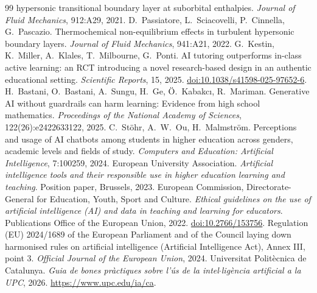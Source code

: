\documentclass[11pt]{article}
\begin{document}
\begin{thebibliography}{99}
hypersonic transitional boundary layer at suborbital enthalpies. \emph{Journal of Fluid
Mechanics}, 912:A29, 2021.
 D.\ Passiatore, L.\ Sciacovelli, P.\ Cinnella, G.\ Pascazio.
Thermochemical non-equilibrium effects in turbulent hypersonic boundary layers.
\emph{Journal of Fluid Mechanics}, 941:A21, 2022.
 G.\ Kestin, K.\ Miller, A.\ Klales, T.\ Milbourne, G.\ Ponti. AI tutoring
outperforms in-class active learning: an RCT introducing a novel research-based design in an
authentic educational setting. \emph{Scientific Reports}, 15, 2025.
\href{https://doi.org/10.1038/s41598-025-97652-6}{doi:10.1038/s41598-025-97652-6}.
 H.\ Bastani, O.\ Bastani, A.\ Sungu, H.\ Ge, \"O.\ Kabakc\i{}, R.\
Mariman. Generative AI without guardrails can harm learning: Evidence from high school
mathematics. \emph{Proceedings of the National Academy of Sciences}, 122(26):e2422633122,
2025.
 C.\ St\"ohr, A.\ W.\ Ou, H.\ Malmstr\"om. Perceptions and usage of AI
chatbots among students in higher education across genders, academic levels and fields of
study. \emph{Computers and Education: Artificial Intelligence}, 7:100259, 2024.
\bibitem{EUA2023} European University Association. \emph{Artificial intelligence tools and
their responsible use in higher education learning and teaching}. Position paper,
Brussels, 2023.
 European Commission, Directorate-General for Education, Youth, Sport and
Culture. \emph{Ethical guidelines on the use of artificial intelligence (AI) and data in
teaching and learning for educators}. Publications Office of the European Union, 2022.
\href{https://data.europa.eu/doi/10.2766/153756}{doi:10.2766/153756}.
\bibitem{AIAct2024} Regulation (EU) 2024/1689 of the European Parliament and of the Council
laying down harmonised rules on artificial intelligence (Artificial Intelligence Act),
Annex III, point 3. \emph{Official Journal of the European Union}, 2024.
\bibitem{UPCAI2026} Universitat Polit\`ecnica de Catalunya. \emph{Guia de bones pr\`actiques
sobre l'\'us de la intel$\cdot$lig\`encia artificial a la UPC}, 2026.
\url{https://www.upc.edu/ia/ca}.
\end{thebibliography}
\end{document}
